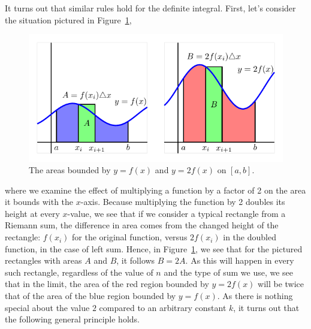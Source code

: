 It turns out that similar rules hold for the definite integral.  First, let's consider the situation pictured in Figure~\ref{F:4.3.ConstMult},
\begin{figure}[h]
\begin{center}
\includegraphics{figures/4_3_ConstMult}
\caption{The areas bounded by $y = f(x)$ and $y = 2f(x)$ on $[a,b]$.} \label{F:4.3.ConstMult}
\end{center}
\end{figure}
where we examine the effect of multiplying a function by a factor of 2 on the area it bounds with the $x$-axis.  Because multiplying the function by 2 doubles its height at every $x$-value, we see that if we consider a typical rectangle from a Riemann sum, the difference in area comes from the changed height of the rectangle:  $f(x_i)$ for the original function, versus $2f(x_i)$ in the doubled function, in the case of left sum.  Hence, in Figure~\ref{F:4.3.ConstMult}, we see that for the pictured rectangles with areas $A$ and $B$, it follows $B = 2A$.  As this will happen in every such rectangle, regardless of the value of $n$ and the type of sum we use, we see that in the limit, the area of the red region bounded by $y = 2f(x)$ will be twice that of the area of the blue region bounded by $y = f(x)$.  As there is nothing special about the value $2$ compared to an arbitrary constant $k$, it turns out that the following general principle holds.

\vspace*{5pt}
\noindent {}
\vspace*{1pt}

